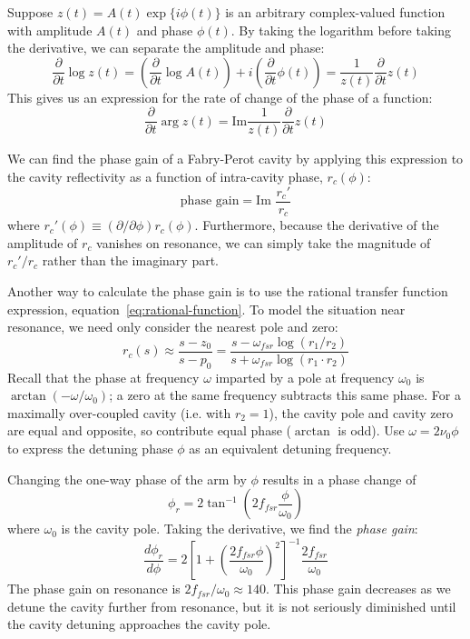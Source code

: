 Suppose $z(t)=A(t) \exp\{i \phi(t)\}$ is an arbitrary complex-valued
function with amplitude $A(t)$ and phase $\phi(t)$. By taking the
logarithm before taking the derivative, we can separate the amplitude
and phase:
%
\begin{equation}
\frac{\partial}{\partial t} \log z(t) = \left(\frac{\partial}{\partial t} \log A(t)\right) + i \left(\frac{\partial}{\partial t} \phi(t)\right)
= \frac{1}{z(t)} \frac{\partial}{\partial t} z(t)
\end{equation}
%
This gives us an expression for the rate of change of the phase of a function:
%
\begin{equation}
\frac{\partial}{\partial t} \arg z(t) = \text{Im} \frac{1}{z(t)} \frac{\partial}{\partial t} z(t)
\end{equation}

We can find the phase gain of a Fabry-Perot cavity by applying this expression to the cavity reflectivity as a function of intra-cavity phase, $r_c(\phi)$:
\begin{equation}
\text{phase gain} = \text{Im\ } \frac{r_c'}{r_c}
\end{equation}
where $r_c'(\phi)\equiv(\partial/\partial\phi)r_c(\phi)$.  Furthermore, because the derivative of the amplitude of $r_c$ vanishes on resonance, we can simply take the magnitude of $r_c'/r_c$ rather than the imaginary part.

Another way to calculate the phase gain is to use the rational transfer function expression, equation~\ref{eq:rational-function}.  To model the situation near resonance, we need only consider the nearest pole and zero:
\[
r_c(s) \approx \frac{s - z_0}{s - p_0}
 = \frac{s - \omega_{fsr}\log \left(r_1 / r_2\right)}
        {s + \omega_{fsr}\log \left(r_1 \cdot r_2\right)}
\]
Recall that the phase at frequency $\omega$ imparted by a pole at
frequency $\omega_0$ is $\arctan\left(-\omega/\omega_0\right)$; a zero
at the same frequency subtracts this same phase.  For a maximally
over-coupled cavity (i.e. with $r_2 = 1$), the cavity pole and cavity
zero are equal and opposite, so contribute equal phase ($\arctan$ is
odd).  Use $\omega = 2\nu_0\phi$ to express the detuning phase $\phi$ as an equivalent detuning frequency.

Changing the one-way phase of the arm by $\phi$ results in a phase 
change of
\begin{equation}
\phi_r = 2 \tan^{-1} \left( 2 f_{fsr} \frac{\phi}{\omega_0} \right)
\end{equation}
where $\omega_0$ is the cavity pole.  Taking the derivative, we find the \emph{phase gain}:
\begin{equation}
  \frac{d \phi_r}{d \phi} = 2 \left[1 + \left(\frac{2 f_{fsr} \phi}{\omega_0}\right)^2 \right]^{-1} \frac{2 f_{fsr}}{\omega_0}
\end{equation}
The phase gain on resonance is $2 f_{fsr} / \omega_0 \approx 140$. This phase gain decreases as we detune the cavity further from resonance, but it is not seriously diminished until the cavity detuning approaches the cavity pole.

